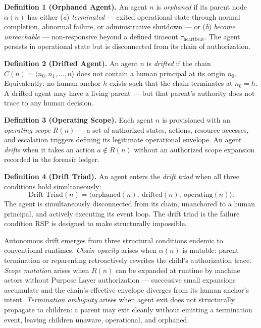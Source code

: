 \medskip
\noindent\textbf{Definition 1 (Orphaned Agent).} An agent $n$ is \emph{orphaned} if its parent node $\alpha(n)$ has either (\textit{a}) \emph{terminated} — exited operational state through normal completion, abnormal failure, or administrative shutdown — or (\textit{b}) \emph{become unreachable} — non-responsive beyond a defined timeout $\tau_{\mathrm{heartbeat}}$. The agent persists in operational state but is disconnected from its chain of authorization.

\medskip
\noindent\textbf{Definition 2 (Drifted Agent).} An agent $n$ is \emph{drifted} if the chain $C(n) = \langle n_0, n_1, \ldots, n \rangle$ does not contain a human principal at its origin $n_0$. Equivalently: no human anchor $h$ exists such that the chain terminates at $n_0 = h$. A drifted agent may have a living parent — but that parent's authority does not trace to any human decision.

\medskip
\noindent\textbf{Definition 3 (Operating Scope).} Each agent $n$ is provisioned with an \emph{operating scope} $R(n)$ — a set of authorized states, actions, resource accesses, and escalation triggers defining its legitimate operational envelope. An agent \emph{drifts} when it takes an action $a \notin R(n)$ without an authorized scope expansion recorded in the forensic ledger.

\medskip
\noindent\textbf{Definition 4 (Drift Triad).} An agent enters the \emph{drift triad} when all three conditions hold simultaneously:
\begin{equation}
\text{Drift Triad}(n) = \bigl\langle \text{orphaned}(n),\ \text{drifted}(n),\ \text{operating}(n) \bigr\rangle .
\label{eq:intro-drift-triad}
\end{equation}
The agent is simultaneously disconnected from its chain, unanchored to a human principal, and actively executing its event loop. The drift triad is the failure condition RSP is designed to make structurally impossible.

Autonomous drift emerges from three structural conditions endemic to conventional runtimes. \emph{Chain opacity} arises when $\alpha(n)$ is mutable: parent termination or reparenting retroactively rewrites the child's authorization trace. \emph{Scope mutation} arises when $R(n)$ can be expanded at runtime by machine actors without Purpose Layer authorization — successive small expansions accumulate and the chain's effective envelope diverges from its human anchor's intent. \emph{Termination ambiguity} arises when agent exit does not structurally propagate to children: a parent may exit cleanly without emitting a termination event, leaving children unaware, operational, and orphaned.

